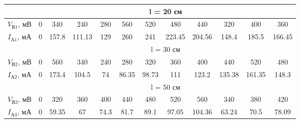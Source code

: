 \documentclass[a4paper]{article}
\begin{document}
\begin{center}
    \begin{tabular}{|c |c | c | c | c | c | c | c | c | c | c | c |} 
     \hline
      & \multicolumn{11}{c|}{l = 20 см}\\
     \hline
     $V_{\text{В1}}$, мВ & 0 & 340 & 240 & 280 & 560 & 520 & 480 & 440 & 320 & 400 & 360  \\ 
     \hline
     $I_{\text{А1}}$, мА & 0 & 157.8 & 111.13 & 129 & 260 & 241 & 223.45 & 204.56 & 148.4 & 185.5 & 166.45 \\
     \hline
     & \multicolumn{11}{c|}{l = 30 см}\\
     \hline
     $V_{\text{В2}}$, мВ & 0 & 560 & 340 & 240 & 280 & 320 & 360 & 400 & 440 & 520 & 480  \\ 
     \hline
     $I_{\text{А2}}$, мА & 0 & 173.4 & 104.5 & 74 & 86.35 & 98.73 & 111 & 123.2 & 135.38 & 161.35 & 148.3 \\
     \hline
     & \multicolumn{11}{c|}{l = 50 см}\\
     \hline
     $V_{\text{В3}}$, мВ & 0 & 320 & 360 & 400 & 440 & 480 & 520 & 560 & 340 & 380 & 420  \\ 
     \hline
     $I_{\text{А3}}$, мА & 0 & 59.35 & 67 & 74.3 & 81.7 & 89.1 & 97.05 & 104.36 & 63.24 & 70.5 & 78.09 \\
     \hline 
    \end{tabular} 
\end{center}
\end{document}
